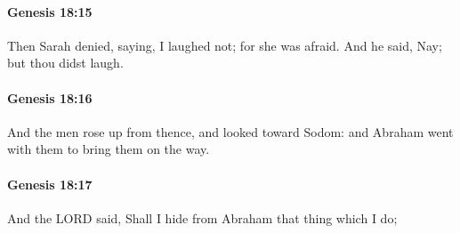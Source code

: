 		\paragraph{Genesis 18:15} %
			\label{GENESIS-18-15}

			Then Sarah denied, saying, I laughed not; for she was afraid.  And he said, Nay; but thou didst laugh.


		\paragraph{Genesis 18:16} %
			\label{GENESIS-18-16}

			And the men rose up from thence, and looked toward Sodom: and Abraham went with them to bring them on the way.


		\paragraph{Genesis 18:17} %
			\label{GENESIS-18-17}

			And the LORD said, Shall I hide from Abraham that thing which I do;


